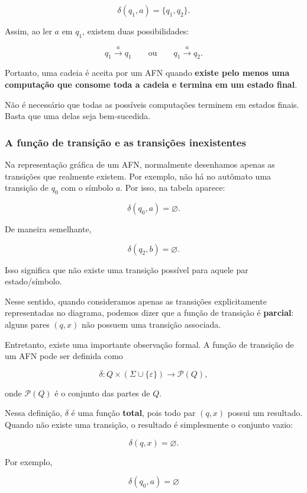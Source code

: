 \documentclass[
  brazilian,
  letterpaper,
]{book}
\theoremstyle{plain}
\theoremstyle{definition}
\theoremstyle{remark}
\begin{document}
\[
\delta(q_1,a)=\{q_1,q_2\}.
\]

Assim, ao ler \(a\) em \(q_1\), existem duas possibilidades:

\[
q_1\xrightarrow{a}q_1
\qquad\text{ou}\qquad
q_1\xrightarrow{a}q_2.
\]

Portanto, uma cadeia é aceita por um AFN quando \textbf{existe pelo
menos uma computação que consome toda a cadeia e termina em um estado
final}.

Não é necessário que todas as possíveis computações terminem em estados
finais. Basta que uma delas seja bem-sucedida.

\subsubsection{A função de transição e as transições
inexistentes}\label{a-funuxe7uxe3o-de-transiuxe7uxe3o-e-as-transiuxe7uxf5es-inexistentes}

Na representação gráfica de um AFN, normalmente desenhamos apenas as
transições que realmente existem. Por exemplo, não há no autômato uma
transição de \(q_0\) com o símbolo \(a\). Por isso, na tabela aparece:

\[
\delta(q_0,a)=\varnothing.
\]

De maneira semelhante,

\[
\delta(q_2,b)=\varnothing.
\]

Isso significa que não existe uma transição possível para aquele par
estado/símbolo.

Nesse sentido, quando consideramos apenas as transições explicitamente
representadas no diagrama, podemos dizer que a função de transição é
\textbf{parcial}: alguns pares \((q,x)\) não possuem uma transição
associada.

Entretanto, existe uma importante observação formal. A função de
transição de um AFN pode ser definida como

\[
\delta:Q\times(\Sigma\cup\{\varepsilon\})
\longrightarrow\mathcal{P}(Q),
\]

onde \(\mathcal{P}(Q)\) é o conjunto das partes de \(Q\).

Nessa definição, \(\delta\) é uma função \textbf{total}, pois todo par
\((q,x)\) possui um resultado. Quando não existe uma transição, o
resultado é simplesmente o conjunto vazio:

\[
\delta(q,x)=\varnothing.
\]

Por exemplo,

\[
\delta(q_0,a)=\varnothing
\]
\end{document}
